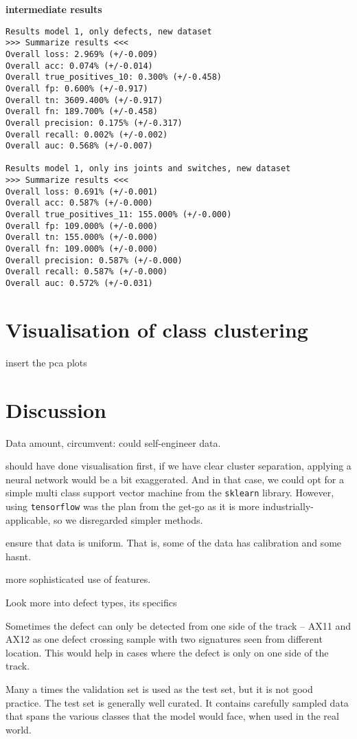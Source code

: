 \textbf{intermediate results}
\begin{verbatim}
Results model 1, only defects, new dataset
>>> Summarize results <<<
Overall loss: 2.969% (+/-0.009)
Overall acc: 0.074% (+/-0.014)
Overall true_positives_10: 0.300% (+/-0.458)
Overall fp: 0.600% (+/-0.917)
Overall tn: 3609.400% (+/-0.917)
Overall fn: 189.700% (+/-0.458)
Overall precision: 0.175% (+/-0.317)
Overall recall: 0.002% (+/-0.002)
Overall auc: 0.568% (+/-0.007)

Results model 1, only ins joints and switches, new dataset
>>> Summarize results <<<
Overall loss: 0.691% (+/-0.001)
Overall acc: 0.587% (+/-0.000)
Overall true_positives_11: 155.000% (+/-0.000)
Overall fp: 109.000% (+/-0.000)
Overall tn: 155.000% (+/-0.000)
Overall fn: 109.000% (+/-0.000)
Overall precision: 0.587% (+/-0.000)
Overall recall: 0.587% (+/-0.000)
Overall auc: 0.572% (+/-0.031)
\end{verbatim}

\section{Visualisation of class clustering}
insert the pca plots

\section{Discussion}
Data amount, circumvent: could self-engineer data. 

should have done visualisation first, if we have clear cluster separation, applying a neural network would be a bit exaggerated. And in that case, we could opt for a simple multi class support vector machine from the \verb|sklearn| library. However, using \verb|tensorflow| was the plan from the get-go as it is more industrially-applicable, so we disregarded simpler methods.

ensure that data is uniform. That is, some of the data has calibration and some hasnt. 

more sophisticated use of features.

Look more into defect types, its specifics

Sometimes the defect can only be detected from one side of the track -- AX11 and AX12 as one defect crossing sample with two signatures seen from different location. This would help in cases where the defect is only on one side of the track.

Many a times the validation set is used as the test set, but it is not good practice. The test set is generally well curated. It contains carefully sampled data that spans the various classes that the model would face, when used in the real world.


